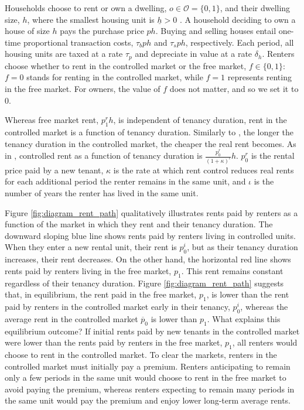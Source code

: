 \documentclass[parskip=full]{article}
\begin{document}
Households choose to rent or own a dwelling, $o \in \mathcal{O}=\{0,1\}$, and their dwelling size, $h$, where the smallest housing unit is $\underline{h}>0$ \citep{gervais,sommeretal-2013,sommersullivan-2017,kaplanetal-2019}. A household deciding to own a house of size $h$ pays the purchase price $p h$. Buying and selling houses entail one-time proportional transaction costs, $\tau_{b} p h$ and $\tau_{s} p h$, respectively. Each period, all housing units are taxed at a rate $\tau_{p}$ and depreciate in value at a rate $\delta_h$. Renters choose whether to rent in the controlled market or the free market, $f \in \{0,1\}$: $f=0$ stands for renting in the controlled market, while $f=1$ represents renting in the free market. For owners, the value of $f$ does not matter, and so we set it to $0$.  

Whereas free market rent, $p^{r}_{1}h$, is independent of tenancy duration, rent in the controlled market is a function of tenancy duration. Similarly to \citet{fmn-2022}, the longer the tenancy duration in the controlled market, the cheaper the real rent becomes. As in \citet{fmn-2022}, controlled rent as a function of tenancy duration is $\frac{p^{r}_{0}}{(1+\kappa)^{\iota}} h$. $p^{r}_{0}$ is the rental price paid by a new tenant, $\kappa$ is the rate at which rent control reduces real rents for each additional period the renter remains in the same unit, and $\iota$ is the number of years the renter has lived in the same unit. 

Figure \ref{fig:diagram_rent_path} qualitatively illustrates rents paid by renters as a function of the market in which they rent and their tenancy duration. The downward sloping blue line shows rents paid by renters living in controlled units. When they enter a new rental unit, their rent is $p^{i}_{0}$, but as their tenancy duration increases, their rent decreases. On the other hand, the horizontal red line shows rents paid by renters living in the free market, $p_{1}$. This rent remains constant regardless of their tenancy duration. Figure \ref{fig:diagram_rent_path} suggests that, in equilibrium, the rent paid in the free market, $p_{1}$, is lower than the rent paid by renters in the controlled market early in their tenancy, $p^{i}_{0}$, whereas the average rent in the controlled market $\overline{p}_{0}$ is lower than $p_{1}$. What explains this equilibrium outcome? If initial rents paid by new tenants in the controlled market were lower than the rents paid by renters in the free market, $p_{1}$, all renters would choose to rent in the controlled market. To clear the markets, renters in the controlled market must initially pay a premium. Renters anticipating to remain only a few periods in the same unit would choose to rent in the free market to avoid paying the premium, whereas renters expecting to remain many periods in the same unit would pay the premium and enjoy lower long-term average rents.
\end{document}
